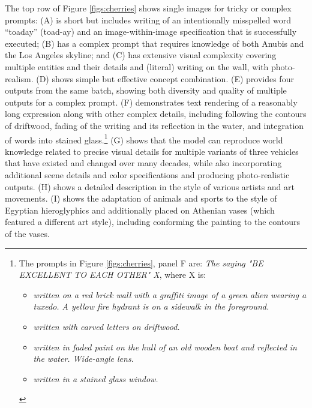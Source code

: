 The top row of Figure \ref{figs:cherries} shows single images for tricky or complex prompts: (A) is short but includes writing of an intentionally misspelled word ``toaday'' (toad-ay) and an image-within-image specification that is successfully executed; (B) has a complex prompt that requires knowledge of both Anubis and the Los Angeles skyline; and (C) has extensive visual complexity covering multiple entities and their details and (literal) writing on the wall, with photo-realism. (D) shows simple but effective concept combination. (E) provides four outputs from the same batch, showing both diversity and quality of multiple outputs for a complex prompt. (F) demonstrates text rendering of a reasonably long expression along with other complex details, including following the contours of driftwood, fading of the writing and its reflection in the water, and integration of words into stained glass.\footnote{The prompts in Figure \ref{figs:cherries}, panel F are: \textit{The saying "BE EXCELLENT TO EACH OTHER" X}, where X is: \begin{itemize}[itemsep=0.5pt]
    \item \textit{written on a red brick wall with a graffiti image of a green alien wearing a tuxedo. A yellow fire hydrant is on a sidewalk in the foreground.}
    \item \textit{written with carved letters on driftwood.}
    \item \textit{written in faded paint on the hull of an old wooden boat and reflected in the water. Wide-angle lens.}
    \item \textit{written in a stained glass window.} \end{itemize}} (G) shows that the model can reproduce world knowledge related to precise visual details for multiple variants of three vehicles that have existed and changed over many decades, while also incorporating additional scene details and color specifications and producing photo-realistic outputs. (H) shows a detailed description in the style of various artists and art movements. (I) shows the adaptation of animals and sports to the style of Egyptian hieroglyphics and additionally placed on Athenian vases (which featured a different art style), including conforming the painting to the contours of the vases.

